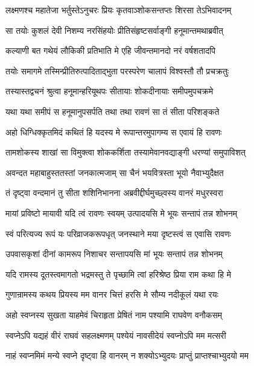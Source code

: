 \twolineshloka
{लक्ष्मणश्च महातेजा भर्तुस्तेऽनुचरः प्रियः}
{कृतवाञ्शोकसन्तप्तः शिरसा तेऽभिवादनम्} %

\twolineshloka
{सा तयोः कुशलं देवी निशम्य नरसिंहयोः}
{प्रीतिसंहृष्टसर्वाङ्गी हनूमान्तमथाब्रवीत्} %

\twolineshloka
{कल्याणी बत गथेयं लौकिकी प्रतिभाति मे}
{एहि जीवन्तमानदो नरं वर्षशतादपि} %

\twolineshloka
{तयोः समागमे तस्मिन्प्रीतिरुत्पादिताद्भुता}
{परस्परेण चालापं विश्वस्तौ तौ प्रचक्रतुः} %

\twolineshloka
{तस्यास्तद्वचनं श्रुत्वा हनूमान्हरियूथपः}
{सीतायाः शोकदीनायाः समीपमुपचक्रमे} %

\twolineshloka
{यथा यथा समीपं स हनूमानुपसर्पति}
{तथा तथा रावणं सा तं सीता परिशङ्कते} %

\twolineshloka
{अहो धिग्धिक्कृतमिदं कथितं हि यदस्य मे}
{रूपान्तरमुपागम्य स एवायं हि रावणः} %

\twolineshloka
{तामशोकस्य शाखां सा विमुक्त्वा शोककर्शिता}
{तस्यामेवानवद्याङ्गी धरण्यां समुपाविशत्} %

\twolineshloka
{अवन्दत महाबाहुस्ततस्तां जनकात्मजाम्}
{सा चैनं भयवित्रस्ता भूयो नैवाभ्युदैक्षत} %

\twolineshloka
{तं दृष्ट्वा वन्दमानं तु सीता शशिनिभानना}
{अब्रवीद्दीर्घमुच्छ्वस्य वानरं मधुरस्वरा} %

\twolineshloka
{मायां प्रविष्टो मायावी यदि त्वं रावणः स्वयम्}
{उत्पादयसि मे भूयः सन्तापं तन्न शोभनम्} %

\twolineshloka
{स्वं परित्यज्य रूपं यः परिव्राजकरूपधृत्}
{जनस्थाने मया दृष्टस्त्वं स एवासि रावणः} %

\twolineshloka
{उपवासकृशां दीनां कामरूप निशाचर}
{सन्तापयसि मां भूयः सन्तापं तन्न शोभनम्} %

\twolineshloka
{यदि रामस्य दूतस्त्वमागतो भद्रमस्तु ते}
{पृच्छामि त्वां हरिश्रेष्ठ प्रिया राम कथा हि मे} %

\twolineshloka
{गुणान्रामस्य कथय प्रियस्य मम वानर}
{चित्तं हरसि मे सौम्य नदीकूलं यथा रयः} %

\twolineshloka
{अहो स्वप्नस्य सुखता याहमेवं चिराहृता}
{प्रेषितं नाम पश्यामि राघवेण वनौकसम्} %

\twolineshloka
{स्वप्नेऽपि यद्यहं वीरं राघवं सहलक्ष्मणम्}
{पश्येयं नावसीदेयं स्वप्नोऽपि मम मत्सरी} %

\twolineshloka
{नाहं स्वप्नमिमं मन्ये स्वप्ने दृष्ट्वा हि वानरम्}
{न शक्योऽभ्युदयः प्राप्तुं प्राप्तश्चाभ्युदयो मम} %

